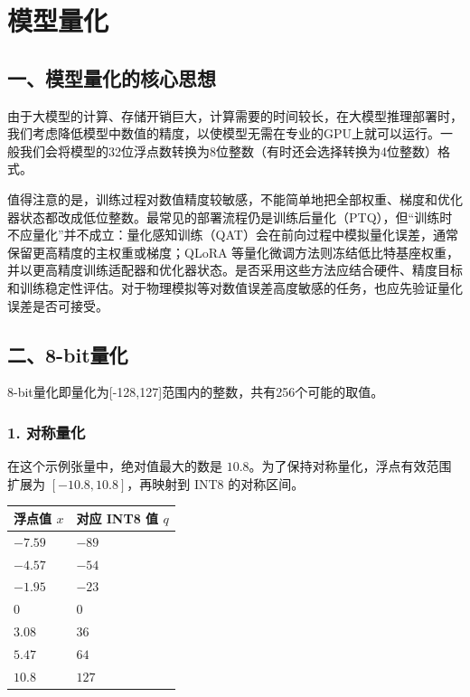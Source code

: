 \setcounter{section}{0}

\hypertarget{ux6a21ux578bux91cfux5316}{%
\section{模型量化}\label{ux6a21ux578bux91cfux5316}}

\hypertarget{ux4e00ux6a21ux578bux91cfux5316ux7684ux6838ux5fc3ux601dux60f3}{%
\subsection{一、模型量化的核心思想}\label{ux4e00ux6a21ux578bux91cfux5316ux7684ux6838ux5fc3ux601dux60f3}}

由于大模型的计算、存储开销巨大，计算需要的时间较长，在大模型推理部署时，我们考虑降低模型中数值的精度，以使模型无需在专业的GPU上就可以运行。一般我们会将模型的32位浮点数转换为8位整数（有时还会选择转换为4位整数）格式。

值得注意的是，训练过程对数值精度较敏感，不能简单地把全部权重、梯度和优化器状态都改成低位整数。最常见的部署流程仍是训练后量化（PTQ），但``训练时不应量化''并不成立：量化感知训练（QAT）会在前向过程中模拟量化误差，通常保留更高精度的主权重或梯度；QLoRA 等量化微调方法则冻结低比特基座权重，并以更高精度训练适配器和优化器状态。是否采用这些方法应结合硬件、精度目标和训练稳定性评估。对于物理模拟等对数值误差高度敏感的任务，也应先验证量化误差是否可接受。

\hypertarget{ux4e8c8-bitux91cfux5316}{%
\subsection{二、8-bit量化}\label{ux4e8c8-bitux91cfux5316}}

8-bit量化即量化为{[}-128,127{]}范围内的整数，共有256个可能的取值。

\hypertarget{ux5bf9ux79f0ux91cfux5316}{%
\subsubsection{1. 对称量化}\label{ux5bf9ux79f0ux91cfux5316}}

在这个示例张量中，绝对值最大的数是 \(10.8\)。为了保持对称量化，浮点有效范围扩展为 \([-10.8, 10.8]\)，再映射到 INT8 的对称区间。

\begin{longtable}[]{@{}
  >{\raggedleft\arraybackslash}p{}
  >{\raggedleft\arraybackslash}p{}@{}}
\toprule
浮点值 \(x\) & 对应 INT8 值 \(q\) \\
\midrule
\endhead
\(-7.59\) & \(-89\) \\
\(-4.57\) & \(-54\) \\
\(-1.95\) & \(-23\) \\
\(0\) & \(0\) \\
\(3.08\) & \(36\) \\
\(5.47\) & \(64\) \\
\(10.8\) & \(127\) \\
\bottomrule
\end{longtable}

